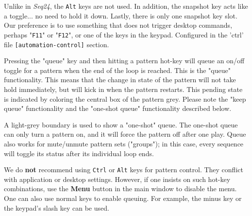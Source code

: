    Unlike in \textsl{Seq24}, the \texttt{Alt} keys are not used.
   In addition, the snapshot key acts like a toggle... no need to hold it down.
   Lastly, there is only one snapshot key slot.
   Our preference is to use something that does not trigger desktop
   commands, perhaps "\texttt{F11}" or "\texttt{F12}", or one of the keys in
   the keypad.
   Configured in the 'ctrl' file
   \texttt{[automation-control]} section.

   Pressing the "queue" key and then hitting a pattern hot-key
   will queue an on/off toggle for a pattern when the end of the loop is
   reached.
   This is the "queue" functionality.
   This means that the change in state of the pattern will not take hold
   immediately, but will kick in when the pattern restarts.
   This pending state is indicated by coloring the central box of the
   pattern grey.
   Please note the "keep queue" functionality and
   the "one-shot queue" functionality described below.

\begin{comment}

\begin{figure}[H]
   \centering 
   \texttt{[image: roll.png]}
   \caption{Pattern Coloration when Queued}
   \label{fig:queueing_coloration}
\end{figure}

   This figure shows

\end{comment}

   A light-grey boundary is used to show a "one-shot" queue.
   The one-shot queue can only turn a pattern on, and it
   will force the pattern off after one play.
   Queue also works for mute/unmute pattern sets ("groups"); in this case,
   every sequence will toggle its status after its individual loop ends. 

   We do \textbf{not}
   recommend using \texttt{Ctrl} or \texttt{Alt}
   keys for pattern control.  They conflict with application or desktop
   settings.  However, if one insists on such hot-key combinations,
   use the \textbf{Menu} button in the main
   window to disable the menu.
   One can also use normal keys to enable queuing.
   For example, the minus key or the keypad's slash key can be used.

